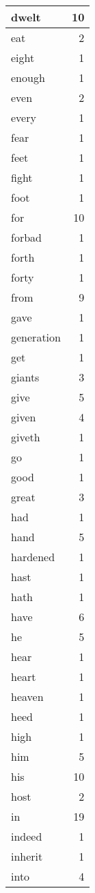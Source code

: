 \begin{center}
\begin{longtable}{l|r}
dwelt & 10 \\ \hline
eat & 2 \\ \hline
eight & 1 \\ \hline
enough & 1 \\ \hline
even & 2 \\ \hline
every & 1 \\ \hline
fear & 1 \\ \hline
feet & 1 \\ \hline
fight & 1 \\ \hline
foot & 1 \\ \hline
for & 10 \\ \hline
forbad & 1 \\ \hline
forth & 1 \\ \hline
forty & 1 \\ \hline
from & 9 \\ \hline
gave & 1 \\ \hline
generation & 1 \\ \hline
get & 1 \\ \hline
giants & 3 \\ \hline
give & 5 \\ \hline
given & 4 \\ \hline
giveth & 1 \\ \hline
go & 1 \\ \hline
good & 1 \\ \hline
great & 3 \\ \hline
had & 1 \\ \hline
hand & 5 \\ \hline
hardened & 1 \\ \hline
hast & 1 \\ \hline
hath & 1 \\ \hline
have & 6 \\ \hline
he & 5 \\ \hline
hear & 1 \\ \hline
heart & 1 \\ \hline
heaven & 1 \\ \hline
heed & 1 \\ \hline
high & 1 \\ \hline
him & 5 \\ \hline
his & 10 \\ \hline
host & 2 \\ \hline
in & 19 \\ \hline
indeed & 1 \\ \hline
inherit & 1 \\ \hline
into & 4 \\ \hline

\end{longtable}
\end{center}
